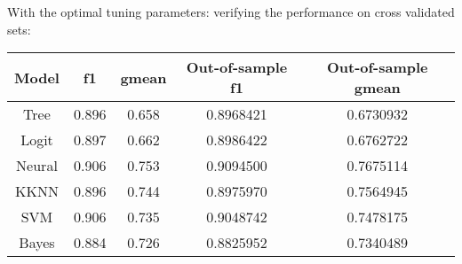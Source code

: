 \documentclass{article}
\begin{document}
With the optimal tuning parameters: verifying the performance on cross validated sets:\\
\begin{center}
 \begin{tabular}{||c c c c c ||} 
 \hline
 Model & f1 & gmean & Out-of-sample f1 & Out-of-sample gmean\\ [0.5ex] 
 \hline\hline
 Tree & 0.896 & 0.658 & 0.8968421 & 0.6730932  \\ 
 \hline
 Logit & 0.897 & 0.662 &  0.8986422 &  0.6762722\\
 \hline
 Neural & 0.906 & 0.753 & 0.9094500 & 0.7675114 \\
 \hline
 KKNN & 0.896 & 0.744 & 0.8975970  & 0.7564945 \\
 \hline
 SVM & 0.906 & 0.735 & 0.9048742 & 0.7478175 \\
 \hline
 Bayes & 0.884 & 0.726 & 0.8825952 & 0.7340489\\[1ex] 
 \hline
\end{tabular}
\end{center}
\end{document}
